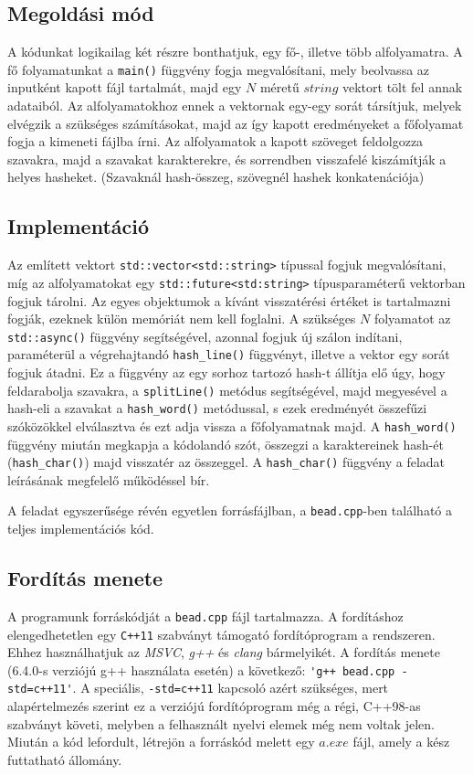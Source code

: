 \documentclass[12pt]{article}
\begin{document}
\subsection{Megoldási mód}

A kódunkat logikailag két részre bonthatjuk, egy fő-, illetve több alfolyamatra. A fő folyamatunkat a \verb|main()| függvény fogja megvalósítani, mely beolvassa az inputként kapott fájl tartalmát, majd egy $N$ méretű $string$ vektort tölt fel annak adataiból. Az alfolyamatokhoz ennek a vektornak egy-egy sorát társítjuk, melyek elvégzik a szükséges számításokat, majd az így kapott eredményeket a főfolyamat fogja a kimeneti fájlba írni.
Az alfolyamatok a kapott szöveget feldolgozza szavakra, majd a szavakat karakterekre, és sorrendben visszafelé kiszámítják a helyes hasheket. (Szavaknál hash-összeg, szövegnél hashek konkatenációja)

\subsection{Implementáció}

Az említett vektort \verb|std::vector<std::string>| típussal fogjuk megvalósítani, míg az alfolyamatokat egy \verb|std::future<std:string>| típusparaméterű vektorban fogjuk tárolni. Az egyes objektumok a kívánt visszatérési értéket is tartalmazni fogják, ezeknek külön memóriát nem kell foglalni. A szükséges $N$ folyamatot az \verb|std::async()| függvény segítségével, azonnal fogjuk új szálon indítani, paraméterül a végrehajtandó \verb|hash_line()| függvényt, illetve a vektor egy sorát fogjuk átadni. Ez a függvény az egy sorhoz tartozó hash-t állítja elő úgy, hogy feldarabolja szavakra, a \verb|splitLine()| metódus segítségével, majd megyesével a hash-eli a szavakat a \verb|hash_word()| metódussal, s ezek eredményét összefűzi szóközökkel elválasztva és ezt adja vissza a főfolyamatnak majd. A \verb|hash_word()| függvény miután megkapja a kódolandó szót, összegzi a karaktereinek hash-ét (\verb|hash_char()|) majd visszatér az összeggel. A \verb|hash_char()| függvény a feladat leírásának megfelelő működéssel bír.

A feladat egyszerűsége révén egyetlen forrásfájlban, a \verb|bead.cpp|-ben található a teljes implementációs kód.

\subsection{Fordítás menete}

A programunk forráskódját a \verb|bead.cpp| fájl tartalmazza. A fordításhoz elengedhetetlen egy \verb|C++11| szabványt támogató fordítóprogram a rendszeren. Ehhez használhatjuk az \textit{MSVC}, \textit{g++} és \textit{clang} bármelyikét. A fordítás menete (6.4.0-s verziójú g++ használata esetén) a következő: \verb|'g++ bead.cpp -std=c++11'|. A speciális, \verb|-std=c++11| kapcsoló azért szükséges, mert alapértelmezés szerint ez a verziójú fordítóprogram még a régi, C++98-as szabványt követi, melyben a felhasznált nyelvi elemek még nem voltak jelen. Miután a kód lefordult, létrejön a forráskód melett egy $a.exe$ fájl, amely a kész futtatható állomány.
\end{document}
